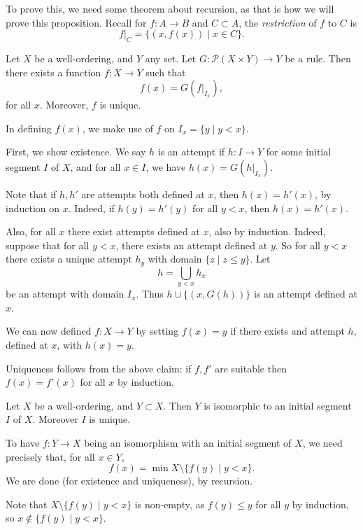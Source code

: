 \documentclass[12pt]{article}
\begin{document}
To prove this, we need some theorem about recursion, as that is how we will prove this proposition. Recall for $f : A \to B$ and $C \subset A$, the \emph{restriction} of $f$ to $C$ is
\[
	f|_C = \{(x, f(x)) \mid x \in C\}
.\]

\begin{theorem}
	Let $X$ be a well-ordering, and $Y$ any set. Let $G : \mathcal{P}(X \times Y) \to Y$ be a rule. Then there exists a function $f : X \to Y$ such that
	\[
	f(x) = G(f|_{I_x})
	,\]
	for all $x$. Moreover, $f$ is unique.
\end{theorem}

In defining $f(x)$, we make use of $f$ on $I_x = \{y \mid y < x\}$.

\begin{proofbox}
	First, we show existence. We say $h$ is an attempt if $h : I \to Y$ for some initial segment $I$ of $X$, and for all $x \in I$, we have $h(x) = G(h|_{I_x})$.

	Note that if $h, h'$ are attempts both defined at $x$, then $h(x) = h'(x)$, by induction on $x$. Indeed, if $h(y) = h'(y)$ for all $y < x$, then $h(x) = h'(x)$.

	Also, for all $x$ there exist attempts defined at $x$, also by induction. Indeed, suppose that for all $y < x$, there exists an attempt defined at $y$. So for all $y < x$ there exists a unique attempt $h_y$ with domain $\{z \mid z \leq y\}$. Let
	\[
	h = \bigcup_{y < x} h_x
	\]
	be an attempt with domain $I_x$. Thus $h \cup \{(x, G(h))\}$ is an attempt defined at $x$.

	We can now defined $f : X \to Y$ by setting $f(x) = y$ if there exists and attempt $h$, defined at $x$, with $h(x) = y$.

	Uniqueness follows from the above claim: if $f, f'$ are suitable then $f(x) = f'(x)$ for all $x$ by induction.
\end{proofbox}

\begin{proposition}
	Let $X$ be a well-ordering, and $Y \subset X$. Then $Y$ is isomorphic to an initial segment $I$ of $X$. Moreover $I$ is unique.
\end{proposition}

\begin{proofbox}
	To have $f : Y \to X$ being an isomorphism with an initial segment of $X$, we need precisely that, for all $x \in Y$,
	\[
		f(x) = \min X \setminus \{f(y) \mid y < x\}
	.\]
	We are done (for existence and uniqueness), by recursion.

	Note that $X \setminus \{f(y) \mid y < x\}$ is non-empty, as $f(y) \leq y$ for all $y$ by induction, so $x \not \in \{f(y) \mid y < x\}$.
\end{proofbox}
\end{document}
